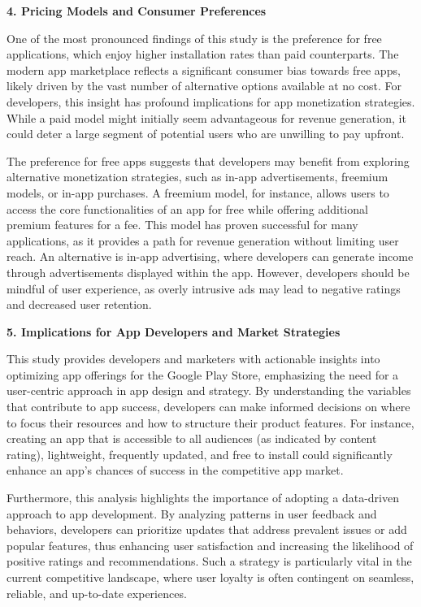 \documentclass[
]{article}
\begin{document}
\textbf{4. Pricing Models and Consumer Preferences}

One of the most pronounced findings of this study is the preference for
free applications, which enjoy higher installation rates than paid
counterparts. The modern app marketplace reflects a significant consumer
bias towards free apps, likely driven by the vast number of alternative
options available at no cost. For developers, this insight has profound
implications for app monetization strategies. While a paid model might
initially seem advantageous for revenue generation, it could deter a
large segment of potential users who are unwilling to pay upfront.

The preference for free apps suggests that developers may benefit from
exploring alternative monetization strategies, such as in-app
advertisements, freemium models, or in-app purchases. A freemium model,
for instance, allows users to access the core functionalities of an app
for free while offering additional premium features for a fee. This
model has proven successful for many applications, as it provides a path
for revenue generation without limiting user reach. An alternative is
in-app advertising, where developers can generate income through
advertisements displayed within the app. However, developers should be
mindful of user experience, as overly intrusive ads may lead to negative
ratings and decreased user retention.

\textbf{5. Implications for App Developers and Market Strategies}

This study provides developers and marketers with actionable insights
into optimizing app offerings for the Google Play Store, emphasizing the
need for a user-centric approach in app design and strategy. By
understanding the variables that contribute to app success, developers
can make informed decisions on where to focus their resources and how to
structure their product features. For instance, creating an app that is
accessible to all audiences (as indicated by content rating),
lightweight, frequently updated, and free to install could significantly
enhance an app's chances of success in the competitive app market.

Furthermore, this analysis highlights the importance of adopting a
data-driven approach to app development. By analyzing patterns in user
feedback and behaviors, developers can prioritize updates that address
prevalent issues or add popular features, thus enhancing user
satisfaction and increasing the likelihood of positive ratings and
recommendations. Such a strategy is particularly vital in the current
competitive landscape, where user loyalty is often contingent on
seamless, reliable, and up-to-date experiences.
\end{document}
